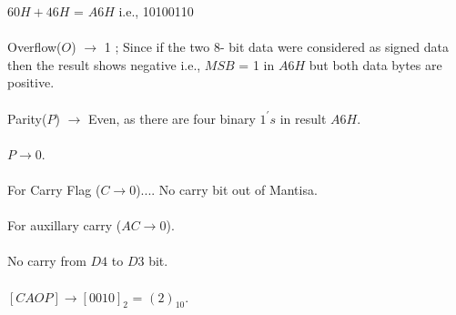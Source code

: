 \documentclass{article}
\begin{document}
\begin{enumerate}
 $60H + 46H$ = $A6H$ i.e., 10100110\\
\\

Overflow($O$) $\rightarrow$ 1 ; Since if the two 8- bit data were considered as signed data then the result shows negative i.e., $MSB$ = 1 in $A6H$ but both data bytes are positive.\\
\\
		Parity($P$) $\rightarrow$ Even, as there are four binary $1^{'} s$ in result $A6H$.\\
\\
$P \rightarrow 0$.\\
\\
For Carry Flag ($C \rightarrow 0$).... No carry bit out of Mantisa.\\
\\
For auxillary carry ($AC \rightarrow 0$).\\
\\
No carry from $D4$ to $D3$ bit.\\
\\
$[CAOP] \rightarrow [0010]_{2}$ = $(2)_{10}$.\\
\\
\end{enumerate}
\end{document}
